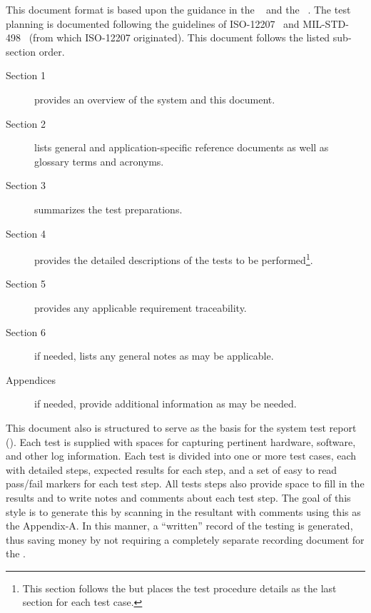 This document format is based upon the guidance in the \STD{} \DID~\cite{ref__STD_DID} and the \STR{} \DID~\cite{ref__STR_DID}.
The test planning is documented following the guidelines of ISO-12207~\cite{ref__ISO_12207} and MIL-STD-498~\cite{ref__MIL_STD_498} (from which ISO-12207 originated).
This document follows the listed \STS sub-section order.
\begin{description}
	\item[Section 1] provides an overview of the system and this document.
	\item[Section 2] lists general and application-specific reference documents as well as glossary terms and acronyms. 
	\item[Section 3] summarizes the test preparations.
	\item[Section 4] provides the detailed descriptions of the tests to be performed\footnote{This section follows the \DID but places the test procedure details as the last section for each test case.}. 
	\item[Section 5] provides any applicable requirement traceability.
	\item[Section 6] if needed, lists any general notes as may be applicable.
	\item[Appendices] if needed, provide additional information as may be needed.
\end{description}


This document also is structured to serve as the basis for the system test report (\STR).
Each test is supplied with spaces for capturing pertinent hardware, software, and other log information.
Each test is divided into one or more test cases, each with detailed steps, expected results for each step, and a set of easy to read pass/fail markers for each test step.
All tests steps also provide space to fill in the results and to write notes and comments about each test step.
The goal of this style is to generate this \STR by scanning in the resultant \STS with comments using this as the  \STR Appendix-A.
In this manner, a ``written'' record of the testing is generated, thus saving money by not requiring a completely separate recording document for the \STR.

% 
